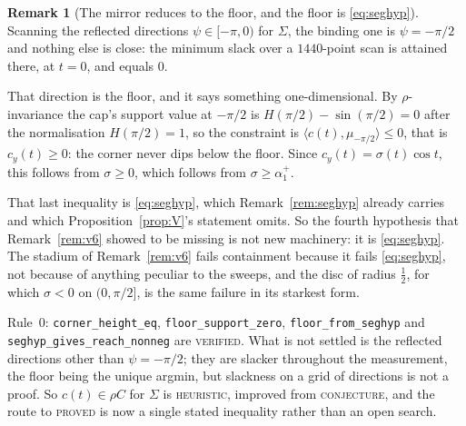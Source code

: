 \documentclass[11pt]{article}
\theoremstyle{definition}
\newtheorem{remark}[theorem]{Remark}
\newcommand{\Sig}{\Sigma}
\begin{document}
\begin{remark}[The mirror reduces to the floor, and the floor is \eqref{eq:seghyp}]\label{rem:v10}
Scanning the reflected directions $\psi\in[-\pi,0)$ for $\Sig$, the binding one is
$\psi=-\pi/2$ and nothing else is close: the minimum slack over a $1440$-point scan is
attained there, at $t=0$, and equals $0$.

That direction is the floor, and it says something one-dimensional. By $\rho$-invariance the
cap's support value at $-\pi/2$ is $H(\pi/2)-\sin(\pi/2)=0$ after the normalisation
$H(\pi/2)=1$, so the constraint is $\langle c(t),\mu_{-\pi/2}\rangle\le0$, that is
$c_y(t)\ge0$: the corner never dips below the floor. Since
$c_y(t)=\sigma(t)\cos t$, this follows from $\sigma\ge0$, which follows from
$\sigma\ge\alpha_1^+$.

That last inequality is \eqref{eq:seghyp}, which Remark~\ref{rem:seghyp} already carries and
which Proposition~\ref{prop:V}'s statement omits. So the fourth hypothesis that
Remark~\ref{rem:v6} showed to be missing is not new machinery: it is \eqref{eq:seghyp}. The
stadium of Remark~\ref{rem:v6} fails containment because it fails \eqref{eq:seghyp}, not
because of anything peculiar to the sweeps, and the disc of radius $\tfrac12$, for which
$\sigma<0$ on $(0,\pi/2]$, is the same failure in its starkest form.

Rule~0: \verb|corner_height_eq|, \verb|floor_support_zero|, \verb|floor_from_seghyp| and
\verb|seghyp_gives_reach_nonneg| are \textsc{verified}. What is not settled is the reflected
directions other than $\psi=-\pi/2$; they are slacker throughout the measurement, the floor
being the unique argmin, but slackness on a grid of directions is not a proof. So
$c(t)\in\rho C$ for $\Sig$ is \textsc{heuristic}, improved from \textsc{conjecture}, and the
route to \textsc{proved} is now a single stated inequality rather than an open search.
\end{remark}
\end{document}
